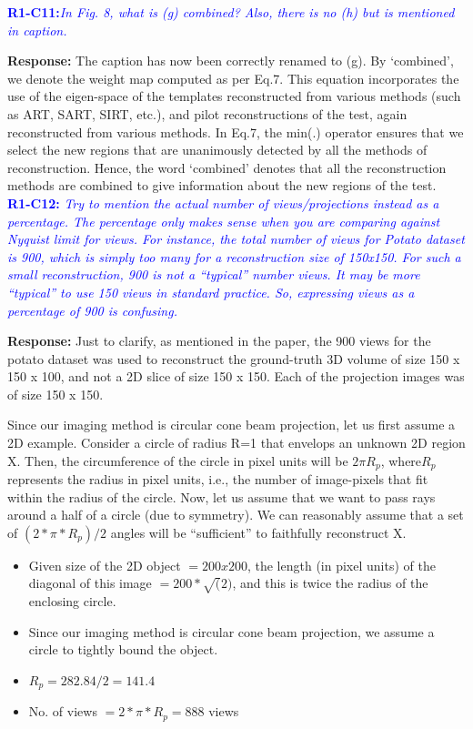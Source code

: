 \documentclass{article}
\begin{document}
\textcolor{blue}{\textbf{R1-C11:}\textit{In Fig. 8, what is (g) combined? Also, there is no (h) but is mentioned in caption.}}

\textbf{Response:} The caption has now been correctly renamed to (g). 
By `combined', we denote the weight map computed as per Eq.7.  This equation incorporates the use of the eigen-space of the templates reconstructed from various methods (such as ART, SART, SIRT, etc.), and pilot reconstructions of the test,  again reconstructed from various methods. In Eq.7, the min(.) operator ensures that we select the new regions that are unanimously detected by all the methods of reconstruction. Hence, the word `combined' denotes that all the reconstruction methods are combined to give information about the new regions of the test.\\

\textcolor{blue}{\textbf{R1-C12:}\textit{ Try to mention the actual number of views/projections instead as a percentage. The percentage only makes sense when you are comparing against Nyquist limit for views. For instance, the total number of views for Potato dataset is 900, which is simply too many for a reconstruction size of 150x150. For such a small reconstruction, 900 is not a ``typical'' number views. It may be more ``typical'' to use 150 views in standard practice. So, expressing views as a percentage of 900 is confusing.}}
  
  \textbf{Response:} Just to clarify, as mentioned in the paper, the 900 views for the potato dataset was used to reconstruct the ground-truth 3D volume of size 150 x 150 x 100, and not a 2D slice of size 150 x 150.  Each of the projection images was of size 150 x 150.
  
Since our imaging method is circular cone beam projection, let us first assume a 2D example. Consider a circle of radius R=1 that envelops an unknown 2D region X. Then, the circumference of the circle in pixel units will be $2\pi R_p$, where$ R_p$ represents the radius in pixel units, i.e., the number of image-pixels that fit within the radius of the circle. Now, let us assume that we want to pass rays around a half of a circle (due to symmetry). We can reasonably assume that a set of $(2*\pi*R_p)/2$ angles will be ``sufficient'' to faithfully reconstruct X.
\begin{itemize}
\item Given size of the 2D object $= 200 x 200$, the length (in pixel units) of the diagonal of this image $= 200*\sqrt(2)$, and this is twice the radius of the enclosing circle.
\item Since our imaging method is circular cone beam projection, we assume a circle to tightly bound the object.
\item $R_p = 282.84/2 = 141.4$
\item No. of views $= 2*\pi*R_p = 888$ views
\end{itemize}
\end{document}
